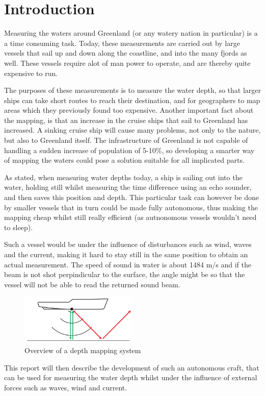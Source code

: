 \documentclass{article}
\begin{document}
\section{Introduction}
Measuring the waters around Greenland (or any watery nation in particular) is a a time consuming task. Today, these measurements are carried out by large vessels that sail up and down along the coastline, and into the many fjords as well. These vessels require alot of man power to operate, and are thereby quite expensive to run.

The purposes of these measurements is to measure the water depth, so that larger ships can take short routes to reach their destination, and for geographers to map areas which they previously found too expensive. Another important fact about the mapping, is that an increase in the cruise ships that sail to Greenland has increased. A sinking cruise ship will cause many problems, not only to the nature, but also to Greenland itself. The infrastructure of Greenland is not capable of handling a sudden increase of population of 5-10\%, so developing a smarter way of mapping the waters could pose a solution suitable for all implicated parts. 

As stated, when measuring water depths today, a ship is sailing out into the water, holding still whilst measuring the time difference using an echo sounder, and then saves this position and depth. This particular task can however be done by smaller vessels that in turn could be made fully autonomous, thus making the mapping cheap whilst still really efficient (as autnonomous vessels wouldn't need to sleep). 

Such a vessel would be under the influence of disturbances such as wind, waves and the current, making it hard to stay still in the same position to obtain an actual measurement. The speed of sound in water is about 1484 m/s and if the beam is not shot perpindicular to the surface, the angle might be so that the vessel will not be able to read the returned sound beam. 

\begin{figure}[h]
\centering
\includegraphics[width=0.5\textwidth]{img/beamer}
\caption{Overview of a depth mapping system}
\label{fig:beamer}
\end{figure}

This report will then describe the development of such an autonomous craft, that can be used for measuring the water depth whilst under the influence of external forces such as waves, wind and current. 
\end{document}
